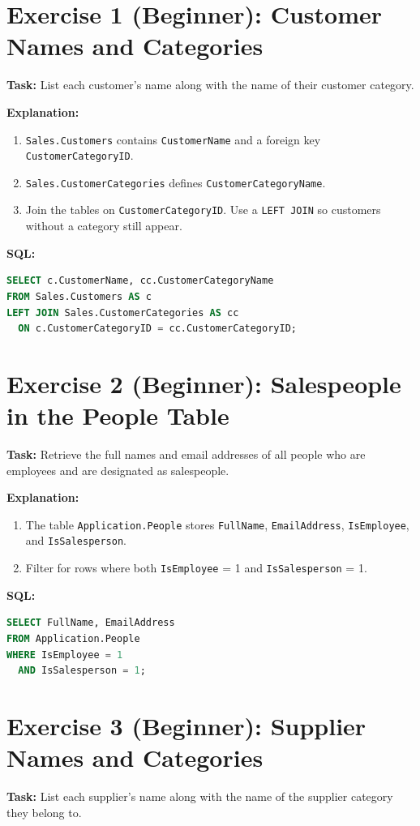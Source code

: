 \documentclass[12pt,a4paper]{article}
\begin{document}
  \section{Exercise 1 (Beginner): Customer Names and Categories}
\textbf{Task:} List each customer’s name along with the name of their customer category.

\textbf{Explanation:}
\begin{enumerate}
  \item \texttt{Sales.Customers} contains \texttt{CustomerName} and a foreign key \texttt{CustomerCategoryID}.
  \item \texttt{Sales.CustomerCategories} defines \texttt{CustomerCategoryName}.
  \item Join the tables on \texttt{CustomerCategoryID}. Use a \texttt{LEFT JOIN} so customers without a category still appear.
\end{enumerate}

\textbf{SQL:}
\begin{lstlisting}[language=SQL]
SELECT c.CustomerName, cc.CustomerCategoryName
FROM Sales.Customers AS c
LEFT JOIN Sales.CustomerCategories AS cc
  ON c.CustomerCategoryID = cc.CustomerCategoryID;
\end{lstlisting}

\section{Exercise 2 (Beginner): Salespeople in the People Table}
\textbf{Task:} Retrieve the full names and email addresses of all people who are employees and are designated as salespeople.

\textbf{Explanation:}
\begin{enumerate}
  \item The table \texttt{Application.People} stores \texttt{FullName}, \texttt{EmailAddress}, \texttt{IsEmployee}, and \texttt{IsSalesperson}.
  \item Filter for rows where both \texttt{IsEmployee} = 1 and \texttt{IsSalesperson} = 1.
\end{enumerate}

\textbf{SQL:}
\begin{lstlisting}[language=SQL]
SELECT FullName, EmailAddress
FROM Application.People
WHERE IsEmployee = 1
  AND IsSalesperson = 1;
\end{lstlisting}

\section{Exercise 3 (Beginner): Supplier Names and Categories}
\textbf{Task:} List each supplier’s name along with the name of the supplier category they belong to.
\end{document}
